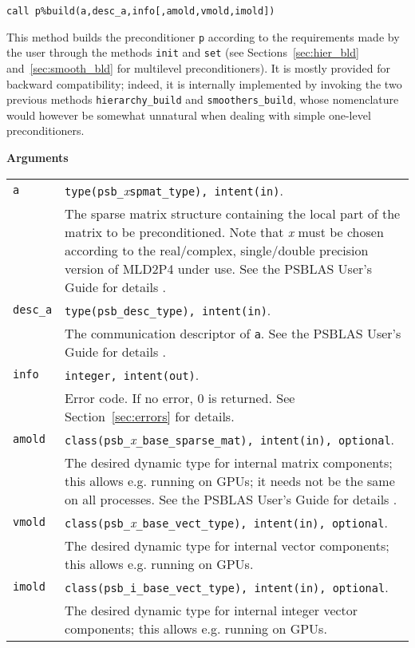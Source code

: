 \begin{center}
\verb|call p%build(a,desc_a,info[,amold,vmold,imold])|\\
\end{center}

\noindent
This method builds the preconditioner \verb|p| according to the requirements
made by the user through the methods \verb|init| and \verb|set|
(see Sections~\ref{sec:hier_bld} and~\ref{sec:smooth_bld} for
multilevel preconditioners). It is mostly provided for backward
compatibility; indeed, it is internally implemented by invoking the
two previous methods \verb|hierarchy_build| and
\verb|smoothers_build|, whose nomenclature would however  be somewhat  
unnatural when dealing with simple one-level preconditioners. 

{\baselineskip\noindent\large\bfseries Arguments} \smallskip

\begin{tabular}{p{1.2cm}p{12cm}}
\verb|a|  & \verb|type(psb_|\emph{x}\verb|spmat_type), intent(in)|. \\
              & The sparse matrix structure containing the local part of the
                matrix to be preconditioned. Note that \emph{x} must be chosen according
                to the real/complex, single/double precision version of MLD2P4 under use.
                See the PSBLAS User's Guide for details \cite{PSBLASGUIDE}.\\
\verb|desc_a| & \verb|type(psb_desc_type), intent(in)|. \\
              & The communication descriptor of \verb|a|. See the PSBLAS User's Guide for
                details \cite{PSBLASGUIDE}.\\
\verb|info|   & \verb|integer, intent(out)|.\\
              & Error code. If no error, 0 is returned. See Section~\ref{sec:errors} for details.\\
\verb|amold| & \verb|class(psb_|\emph{x}\verb|_base_sparse_mat), intent(in), optional|. \\
 & The desired dynamic type for internal matrix
  components; this allows e.g. running on GPUs; it needs not be the
  same on all processes. See the PSBLAS User's Guide for
  details \cite{PSBLASGUIDE}. \\
  \verb|vmold| & \verb|class(psb_|\emph{x}\verb|_base_vect_type), intent(in), optional|. \\
  & The desired dynamic type for internal vector
  components; this allows e.g. running on GPUs. \\
  \verb|imold| & \verb|class(psb_i_base_vect_type), intent(in), optional|. \\
  & The desired dynamic type for internal integer vector
  components; this allows e.g. running on GPUs. \\
\end{tabular}

